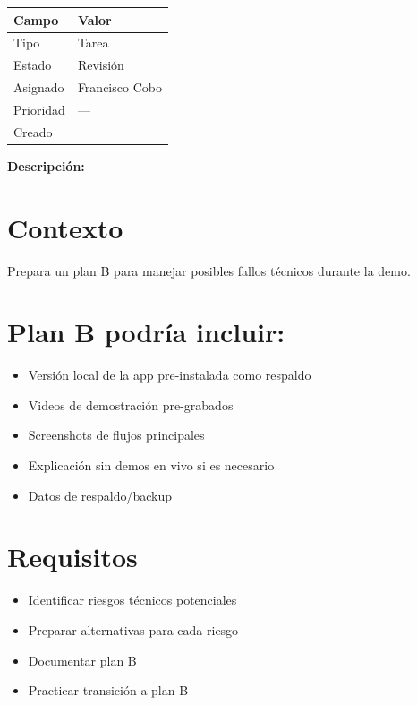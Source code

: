 \documentclass[
  spanish,
  11pt,
]{report}
\newcounter{none} %
\providecommand{\tightlist}{%
  \setlength{\itemsep}{0pt}\setlength{\parskip}{0pt}}
\begin{document}
{\def\LTcaptype{none} %
\begin{longtable}[]{@{}ll@{}}
\toprule\noalign{}
Campo & Valor \\
\midrule\noalign{}
\endhead
\bottomrule\noalign{}
\endlastfoot
Tipo & Tarea \\
Estado & Revisión \\
Asignado & Francisco Cobo \\
Prioridad & --- \\
Creado & \\
\end{longtable}
}

\textbf{Descripción:}

\section{Contexto}\label{contexto-12}

Prepara un plan B para manejar posibles fallos técnicos durante la demo.

\section{Plan B podría incluir:}\label{plan-b-podruxeda-incluir}

\begin{itemize}
\tightlist
\item
  Versión local de la app pre-instalada como respaldo
\item
  Videos de demostración pre-grabados
\item
  Screenshots de flujos principales
\item
  Explicación sin demos en vivo si es necesario
\item
  Datos de respaldo/backup
\end{itemize}

\section{Requisitos}\label{requisitos-11}

\begin{itemize}
\tightlist
\item
  Identificar riesgos técnicos potenciales
\item
  Preparar alternativas para cada riesgo
\item
  Documentar plan B
\item
  Practicar transición a plan B
\end{itemize}
\end{document}
